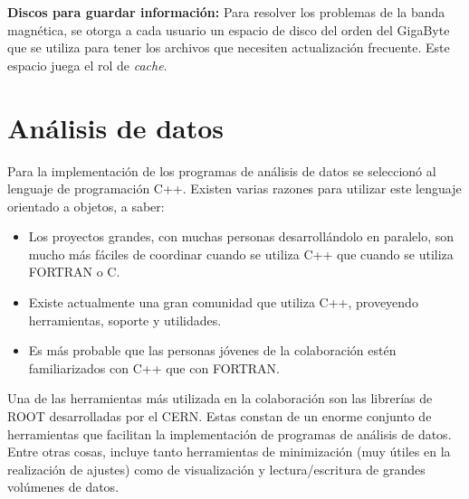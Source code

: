 	{\bf Discos para guardar información:} Para resolver los problemas de la banda magnética, se otorga a cada usuario un espacio de disco del orden del GigaByte que se utiliza para tener los archivos que necesiten actualización frecuente. 
	Este espacio juega el rol de {\em cache}.
	
	\section{An\'alisis de datos}
	
	Para la implementación de los programas de análisis de datos se seleccionó al lenguaje de programación C++. Existen varias razones para utilizar este lenguaje orientado a objetos, a saber:
	
	\begin{itemize}
	\item Los proyectos grandes, con muchas personas desarroll\'andolo en paralelo, son mucho m\'as f\'aciles de coordinar cuando se utiliza C++ que cuando se utiliza FORTRAN o C.
	\item Existe actualmente una gran comunidad que utiliza C++, proveyendo herramientas, soporte y utilidades.
	\item Es m\'as probable que las personas j\'ovenes de la colaboraci\'on est\'en familiarizados con C++ que con FORTRAN.
	\end{itemize}

	Una de las herramientas m\'as utilizada en la colaboraci\'on son las librer\'ias de ROOT \cite{ROOT} desarrolladas por el CERN.
	Estas constan de un enorme conjunto de herramientas que facilitan la implementación de programas de análisis de datos. 
	Entre otras cosas, incluye tanto herramientas de minimización (muy útiles en la realización de ajustes) como de visualización y lectura/escritura de grandes volúmenes de datos.
